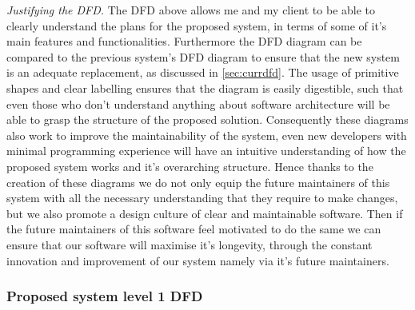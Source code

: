 \textit{Justifying the DFD.} The DFD above allows me and my
client to be able to clearly understand the plans for the
proposed system, in terms of some of it's main features and
functionalities. Furthermore the DFD diagram can be compared to
the previous system's DFD diagram to ensure that the new
system is an adequate replacement, as discussed in
\ref{sec:currdfd}. The usage of primitive shapes and clear
labelling ensures that the diagram is easily digestible, such
that even those who don't understand anything about software
architecture will be able to grasp the structure of the
proposed solution. Consequently these diagrams also work to
improve the maintainability of the system, even new developers
with minimal programming experience will have an intuitive
understanding of how the proposed system works and it's
overarching structure. Hence thanks to the creation of these
diagrams we do not only equip the future maintainers of this
system with all the necessary understanding that they require
to make changes, but we also promote a design culture of clear
and maintainable software. Then if the future maintainers of this
software feel motivated to do the same we can ensure that our
software will maximise it's longevity, through the constant
innovation and improvement of our system namely via it's
future maintainers.

\subsubsection{Proposed system level 1 DFD}

